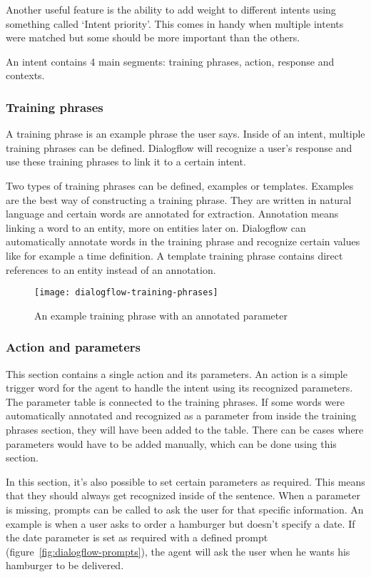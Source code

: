 Another useful feature is the ability to add weight to different intents using something called `Intent priority'. This comes in handy when multiple intents were matched but some should be more important than the others.

An intent contains 4 main segments: training phrases, action, response and contexts.

\subsubsection{Training phrases}

A training phrase is an example phrase the user says. Inside of an intent, multiple training phrases can be defined. Dialogflow will recognize a user's response and use these training phrases to link it to a certain intent.

Two types of training phrases can be defined, examples or templates. Examples are the best way of constructing a training phrase. They are written in natural language and certain words are annotated for extraction. Annotation means linking a word to an entity, more on entities later on. Dialogflow can automatically annotate words in the training phrase and recognize certain values like for example a time definition. A template training phrase contains direct references to an entity instead of an annotation.

\begin{figure}[ht]
	\centering
	\texttt{[image: dialogflow-training-phrases]}\label{fig:dialogflow-training-phrases}
	\caption{An example training phrase with an annotated parameter}
\end{figure}

\subsubsection{Action and parameters}

This section contains a single action and its parameters. An action is a simple trigger word for the agent to handle the intent using its recognized parameters. The parameter table is connected to the training phrases. If some words were automatically annotated and recognized as a parameter from inside the training phrases section, they will have been added to the table. There can be cases where parameters would have to be added manually, which can be done using this section.

In this section, it's also possible to set certain parameters as required. This means that they should always get recognized inside of the sentence. When a parameter is missing, prompts can be called to ask the user for that specific information. An example is when a user asks to order a hamburger but doesn't specify a date. If the date parameter is set as required with a defined prompt (figure~\ref{fig:dialogflow-prompts}), the agent will ask the user when he wants his hamburger to be delivered.

